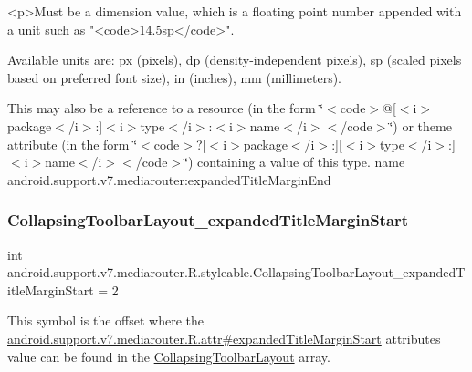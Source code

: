 \begin{DoxyVerb}      <p>Must be a dimension value, which is a floating point number appended with a unit such as "<code>14.5sp</code>".
\end{DoxyVerb}
 Available units are\+: px (pixels), dp (density-\/independent pixels), sp (scaled pixels based on preferred font size), in (inches), mm (millimeters). 

This may also be a reference to a resource (in the form \char`\"{}$<$code$>$@\mbox{[}$<$i$>$package$<$/i$>$\+:\mbox{]}$<$i$>$type$<$/i$>$\+:$<$i$>$name$<$/i$>$$<$/code$>$\char`\"{}) or theme attribute (in the form \char`\"{}$<$code$>$?\mbox{[}$<$i$>$package$<$/i$>$\+:\mbox{]}\mbox{[}$<$i$>$type$<$/i$>$\+:\mbox{]}$<$i$>$name$<$/i$>$$<$/code$>$\char`\"{}) containing a value of this type.  name android.\+support.\+v7.\+mediarouter\+:expanded\+Title\+Margin\+End \mbox{\label{classandroid_1_1support_1_1v7_1_1mediarouter_1_1R_1_1styleable_a59b6f64edf96c1e41a735bced54430bd}} 
\subsubsection{\texorpdfstring{Collapsing\+Toolbar\+Layout\+\_\+expanded\+Title\+Margin\+Start}{CollapsingToolbarLayout\_expandedTitleMarginStart}}
{\footnotesize\ttfamily int android.\+support.\+v7.\+mediarouter.\+R.\+styleable.\+Collapsing\+Toolbar\+Layout\+\_\+expanded\+Title\+Margin\+Start = 2\hspace{0.3cm}{\ttfamily [static]}}

This symbol is the offset where the \hyperlink{classandroid_1_1support_1_1v7_1_1mediarouter_1_1R_1_1attr_a96b4e59b005c6dd2be8bb1e64996185b}{android.\+support.\+v7.\+mediarouter.\+R.\+attr\#expanded\+Title\+Margin\+Start} attribute\textquotesingle{}s value can be found in the \hyperlink{classandroid_1_1support_1_1v7_1_1mediarouter_1_1R_1_1styleable_aae2cb4975e9b9a19d129888f497cc386}{Collapsing\+Toolbar\+Layout} array.


